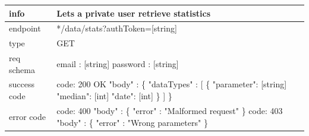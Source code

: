 \documentclass[titlepage]{article}
\begin{document}
\vspace{\baselineskip}

\begin{tabularx}{\textwidth}{lX} \hline
    info & Lets a private user retrieve statistics \\ \hline
    endpoint & */data/stats?authToken=[string] \\ \hline
    type & GET \\ \hline
    req schema & 
        email : [string] \newline
        password : [string] \\ \hline
    success code &
        code: 200 OK \newline \newline 
        "body" : \{ \newline
        "dataTypes" : [\newline
        \{
        "parameter": [string] \newline
        "median": [int] \newline
        "date": [int] \newline
        \}
        ] \newline
        \} \\ \hline
    error code &
        code: 400 \newline
        "body" : \{ "error" : "Malformed request" \} \newline \newline
        code: 403 \newline
        "body" : \{ "error" : "Wrong parameters" \}
\end{tabularx}
		
\vspace{\baselineskip}
\end{document}
